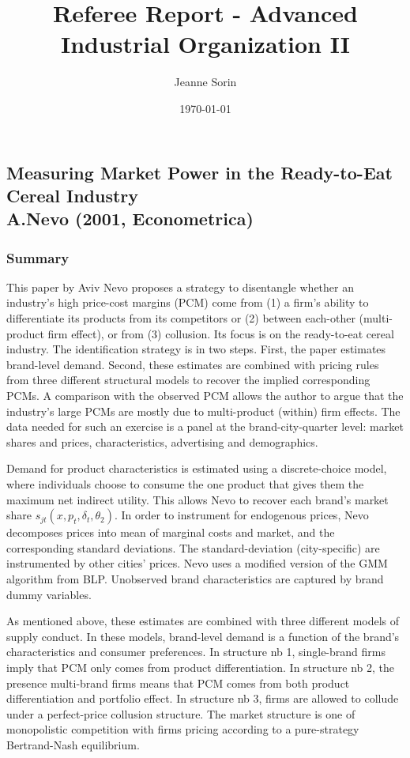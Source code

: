\documentclass[11pt, final]{article}
\title{Referee Report - Advanced Industrial Organization II}
\author{Jeanne Sorin}
\date{\today}
\begin{document}
\maketitle

\subsection*{Measuring Market Power in the Ready-to-Eat Cereal Industry \\ A.Nevo (2001, Econometrica)}

\subsubsection*{Summary} %
\label{sub:summary}

This paper by Aviv Nevo proposes a strategy to disentangle whether an industry's high price-cost margins (PCM) come from (1) a firm's ability to differentiate its products from its competitors or (2) between each-other (multi-product firm effect), or from (3) collusion. 
Its focus is on the ready-to-eat cereal industry.
The identification strategy is in two steps.
First, the paper estimates brand-level demand.
Second, these estimates are combined with pricing rules from three different structural models to recover the implied corresponding PCMs. A comparison with the observed PCM allows the author to argue that the industry's large PCMs are mostly due to multi-product (within) firm effects.
The data needed for such an exercise is a panel at the brand-city-quarter level: market shares and prices, characteristics, advertising and demographics.

Demand for product characteristics is estimated using a discrete-choice model, where individuals choose to consume the one product that gives them the maximum net indirect utility. This allows Nevo to recover each brand's market share $s_{jt}(x, p_t, \delta_t, \theta_2)$. In order to instrument for endogenous prices, Nevo decomposes prices into mean of marginal costs and market, and the corresponding standard deviations. The standard-deviation (city-specific) are instrumented by other cities' prices.
Nevo uses a modified version of the GMM algorithm from BLP. Unobserved brand characteristics are captured by brand dummy variables.

As mentioned above, these estimates are combined with three different models of supply conduct. In these models, brand-level demand is a function of the brand's characteristics and consumer preferences. In structure nb 1, single-brand firms imply that PCM only comes from product differentiation. In structure nb 2, the presence multi-brand firms means that PCM comes from both product differentiation and portfolio effect. In structure nb 3, firms are allowed to collude under a perfect-price collusion structure.
The market structure is one of monopolistic competition with firms pricing according to a pure-strategy Bertrand-Nash equilibrium.
\end{document}
